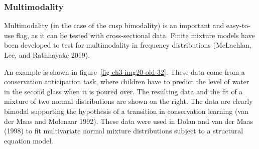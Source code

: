 \documentclass[
  a4paper,
  DIV=11,
  numbers=noendperiod,
  oneside]{scrreprt}
\newenvironment{Shaded}{}{}
\newcommand{\AttributeTok}[1]{\textcolor[rgb]{0.84,0.23,0.29}{#1}}
\newcommand{\CommentTok}[1]{\textcolor[rgb]{0.42,0.45,0.49}{#1}}
\newcommand{\ConstantTok}[1]{\textcolor[rgb]{0.00,0.36,0.77}{#1}}
\newcommand{\DecValTok}[1]{\textcolor[rgb]{0.00,0.36,0.77}{#1}}
\newcommand{\FunctionTok}[1]{\textcolor[rgb]{0.44,0.26,0.76}{#1}}
\newcommand{\NormalTok}[1]{\textcolor[rgb]{0.14,0.16,0.18}{#1}}
\newcommand{\OtherTok}[1]{\textcolor[rgb]{0.44,0.26,0.76}{#1}}
\newcommand{\SpecialCharTok}[1]{\textcolor[rgb]{0.00,0.36,0.77}{#1}}
\newcommand{\StringTok}[1]{\textcolor[rgb]{0.01,0.18,0.38}{#1}}
\begin{document}
\begin{Shaded}
\end{Shaded}

\subsubsection{Multimodality}\label{sec-Multimodality}

Multimodality (in the case of the cusp bimodality) is an important and
easy-to-use flag, as it can be tested with cross-sectional data. Finite
mixture models have been developed to test for multimodality in
frequency distributions (McLachlan, Lee, and Rathnayake 2019).

An example is shown in figure~\ref{fig-ch3-img20-old-32}. These data
come from a conservation anticipation task, where children have to
predict the level of water in the second glass when it is poured over.
The resulting data and the fit of a mixture of two normal distributions
are shown on the right. The data are clearly bimodal supporting the
hypothesis of a transition in conservation learning (van der Maas and
Molenaar 1992). These data were used in Dolan and van der Maas (1998) to
fit multivariate normal mixture distributions subject to a structural
equation model.
\end{document}
